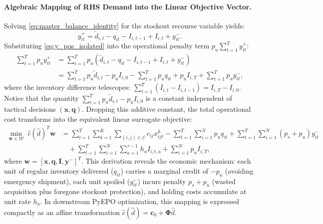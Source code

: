 \documentclass[11pt,a4paper]{article}
\theoremstyle{definition}
\theoremstyle{remark}
\begin{document}
\paragraph{Algebraic Mapping of RHS Demand into the Linear Objective Vector.}
Solving \eqref{eq:master_balance_identity} for the stockout recourse variable yields:
\begin{equation}
    y_{it}^+ = \tilde{d}_{i,t} - q_{it} - I_{i,t-1} + I_{i,t} + y_{it}^-. \label{eq:y_pos_isolated}
\end{equation}
Substituting \eqref{eq:y_pos_isolated} into the operational penalty term $p_u \sum_{t=1}^T y_{it}^+$:
\begin{align*}
    \sum_{t=1}^T p_u y_{it}^+ &= \sum_{t=1}^T p_u \left( \tilde{d}_{i,t} - q_{it} - I_{i,t-1} + I_{i,t} + y_{it}^- \right) \\
    &= \sum_{t=1}^T p_u \tilde{d}_{i,t} - p_u I_{i,0} - \sum_{t=1}^T p_u q_{it} + p_u I_{i,T} + \sum_{t=1}^T p_u y_{it}^-,
\end{align*}
where the inventory difference telescopes: $\sum_{t=1}^T (I_{i,t} - I_{i,t-1}) = I_{i,T} - I_{i,0}$. Notice that the quantity $\sum_{t=1}^T p_u \tilde{d}_{i,t} - p_u I_{i,0}$ is a constant independent of tactical decisions $(\mathbf{x}, \mathbf{q})$. Dropping this additive constant, the total operational cost transforms into the equivalent linear surrogate objective:
\begin{align}
    \min_{\mathbf{w} \in \mathcal{W}} \; \hat{c}(\hat{d})^T \mathbf{w} &= \sum_{t=1}^T \sum_{k=1}^K \sum_{(i,j) \in \mathcal{E}} c_{ij} x_{ijt}^k - \sum_{t=1}^T \sum_{i=1}^N p_u q_{it} + \sum_{t=1}^T \sum_{i=1}^N (p_s + p_u) y_{it}^- \nonumber \\
    &\quad + \sum_{t=1}^T \sum_{i=1}^N \sum_{a=1}^{\tau-1} h_a I_{i,t,a} + \sum_{i=1}^N p_u I_{i,T}, \label{eq:linear_surrogate_objective}
\end{align}
where $\mathbf{w} = [\mathbf{x}, \mathbf{q}, \mathbf{I}, \mathbf{y}^-]^T$. This derivation reveals the economic mechanism: each unit of regular inventory delivered ($q_{it}$) carries a marginal credit of $-p_u$ (avoiding emergency shipment), each unit spoiled ($y_{it}^-$) incurs penalty $p_s + p_u$ (wasted acquisition plus foregone stockout protection), and holding costs accumulate at unit rate $h_a$. In downstream PyEPO optimization, this mapping is expressed compactly as an affine transformation $\hat{c}(\hat{d}) = \mathbf{c}_0 + \mathbf{\Phi} \hat{d}$.
\end{document}
